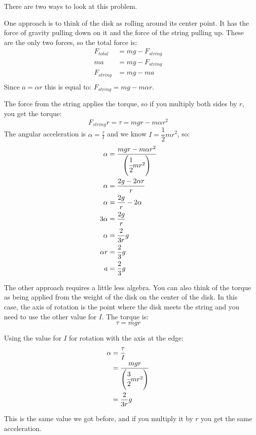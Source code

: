 \documentclass{exam}
\begin{document}
\begin{solution}

There are two ways to look at this problem.

One approach is to think of the disk as rolling around its center point.  It has the force of gravity pulling down on it
and the force of the string pulling up.  These are the only two forces, so the total force is:
\begin{align*}
  F_{total} &= mg - F_{string} \\
  ma &= mg - F_{string} \\
  F_{string} &= mg - ma \\
\end{align*}
Since $a = \alpha r$ this is equal to: $F_{string} = mg - m \alpha r$.

The force from the string applies the torque, so if you multiply both sides by $r$, you get the torque:
\[
  F_{string} r = \tau = mgr - m \alpha r^2
\]
The angular acceleration is $\alpha = \frac{\tau}{I}$ and we know $I = \dfrac{1}{2} mr^2$, so:
\begin{align*}
  \alpha &= \frac{mgr - m \alpha r^2 }{\left(\cfrac{1}{2} mr^2 \right)} \\
  \alpha &= \frac{2g - 2 \alpha r }{r} \\
  \alpha &= \frac{2g}{r} - 2 \alpha \\
  3 \alpha &= \frac{2g}{r} \\
  \alpha &= \frac{2}{3r} g \\  
  \alpha r &= \frac{2}{3} g \\
  a &= \frac{2}{3} g \\  
\end{align*}

The other approach requires a little less algebra.  You can also think of the torque as being applied from the
weight of the disk on the center of the disk.  In this case, the axis of rotation is the point where the disk meets the
string and you need to use the other value for $I$.
The torque is:
\[
  \tau = mgr
\]

Using the value for $I$ for rotation with the axis at the edge:
\begin{align*}
  \alpha &= \frac{\tau}{I} \\
  &= \frac{mgr}{\left( \cfrac{3}{2} mr^2 \right)} \\
  &= \frac{2}{3r} g \\  
\end{align*}

This is the same value we got before, and if you multiply it by $r$ you get the same acceleration.

\end{solution}
\end{document}

